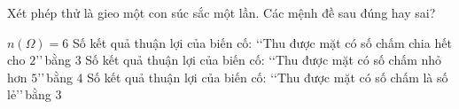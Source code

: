 \begin{ex}%
Xét phép thử là gieo một con súc sắc một lần. Các mệnh đề sau đúng hay sai?

	\choiceTF
	{\True $n\left(\Omega\right) = 6$}
	{\True Số kết quả thuận lợi của biến cố: \lq\lq Thu được mặt có số chấm chia hết cho $2$\rq\rq\,bằng $3$}
	{\True Số kết quả thuận lợi của biến cố: \lq\lq Thu được mặt có số chấm nhỏ hơn $5$\rq\rq\,bằng $4$}
	{\True Số kết quả thuận lợi của biến cố: \lq\lq Thu được mặt có số chấm là số lẻ\rq\rq\,bằng $3$}
\end{ex}


